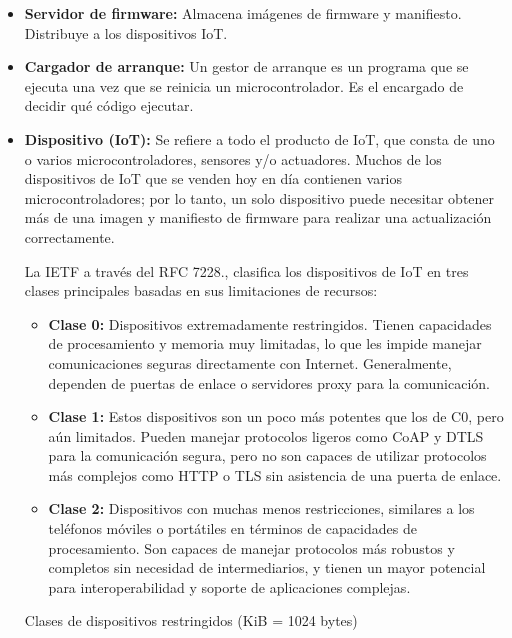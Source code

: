 \begin{itemize}
    \item \textbf{Servidor de firmware: } Almacena imágenes de firmware y manifiesto. Distribuye a los dispositivos IoT.
    \item \textbf{Cargador de arranque: } Un gestor de arranque es un programa que se ejecuta una vez que se reinicia un microcontrolador. Es el encargado de decidir qué código ejecutar.
\item \textbf{Dispositivo (IoT): } Se refiere a todo el producto de IoT, que consta de uno o varios microcontroladores, sensores y/o actuadores. Muchos de los dispositivos de IoT que se venden hoy en día contienen varios microcontroladores; por lo tanto, un solo dispositivo puede necesitar obtener más de una imagen y manifiesto de firmware para realizar una actualización correctamente.\cite{rfc9019}

La IETF a través del RFC 7228.\cite{rfc7228}, clasifica los dispositivos de IoT en tres clases principales basadas en sus limitaciones de recursos:

    \begin{itemize}
        \item \textbf{Clase 0: }Dispositivos extremadamente restringidos. Tienen capacidades de procesamiento y memoria muy limitadas, lo que les impide manejar comunicaciones seguras directamente con Internet. Generalmente, dependen de puertas de enlace o servidores proxy para la comunicación.
        \item \textbf{Clase 1: }Estos dispositivos son un poco más potentes que los de C0, pero aún limitados. Pueden manejar protocolos ligeros como CoAP y DTLS para la comunicación segura, pero no son capaces de utilizar protocolos más complejos como HTTP o TLS sin asistencia de una puerta de enlace.
        \item \textbf{Clase 2: }Dispositivos con muchas menos restricciones, similares a los teléfonos móviles o portátiles en términos de capacidades de procesamiento. Son capaces de manejar protocolos más robustos y completos sin necesidad de intermediarios, y tienen un mayor potencial para interoperabilidad y soporte de aplicaciones complejas.
    \end{itemize}

\begin{table}[ht]
    \centering
    \caption{Clases de dispositivos restringidos (KiB = 1024 bytes)}
    \label{tab:Clases_de_dispositivos_restringidos}
\end{table}

\end{itemize}

